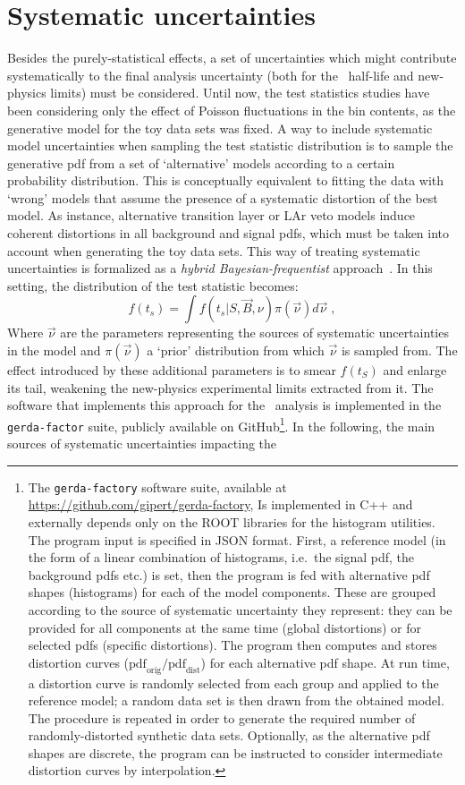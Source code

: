\section{Systematic uncertainties}%
\label{sec:2nbb-ana:systematics}

Besides the purely-statistical effects, a set of uncertainties which might contribute
systematically to the final analysis uncertainty (both for the \nnbb\ half-life and
new-physics limits) must be considered. Until now, the test statistics studies have been
considering only the effect of Poisson fluctuations in the bin contents, as the generative
model for the toy data sets was fixed. A way to include systematic model uncertainties
when sampling the test statistic distribution is to sample the generative pdf from a set
of `alternative' models according to a certain probability distribution. This is
conceptually equivalent to fitting the data with `wrong' models that assume the presence
of a systematic distortion of the best model. As instance, alternative transition layer
or LAr veto models induce coherent distortions in all background and signal pdfs, which
must be taken into account when generating the toy data sets.
\newpar
This way of treating systematic uncertainties is formalized as a \emph{hybrid
Bayesian-frequentist} approach~\cite{Zyla2020}. In this setting, the distribution
of the test statistic becomes:
\[
  f(t_s) = \int f(t_s | S, \vec{B}, \nu) \pi(\vec{\nu}) d\vec{\nu} \;,
\]
Where $\vec{\nu}$ are the parameters representing the sources of systematic uncertainties
in the model and $\pi(\vec{\nu})$ a `prior' distribution from which $\vec{\nu}$ is sampled
from. The effect introduced by these additional parameters is to smear $f(t_S)$ and
enlarge its tail, weakening the new-physics experimental limits extracted from it. The
software that implements this approach for the \nnbb\ analysis is implemented in the
\texttt{gerda-factor} suite, publicly available on GitHub\footnote{%
  The \texttt{gerda-factory} software suite, available at
  \url{https://github.com/gipert/gerda-factory}, Is implemented in C++ and externally
  depends only on the ROOT libraries for the histogram utilities. The program input is
  specified in JSON format. First, a reference model (in the form of a linear combination
  of histograms, i.e.~the signal pdf, the background pdfs etc.) is set, then the program
  is fed with alternative pdf shapes (histograms) for each of the model components. These
  are grouped according to the source of systematic uncertainty they represent: they can
  be provided for all components at the same time (global distortions) or for selected
  pdfs (specific distortions). The program then computes and stores distortion curves
  ($\text{pdf}_\text{orig}/\text{pdf}_\text{dist}$) for each alternative pdf shape. At run
  time, a distortion curve is randomly selected from each group and applied to the
  reference model; a random data set is then drawn from the obtained model. The procedure
  is repeated in order to generate the required number of randomly-distorted synthetic
  data sets. Optionally, as the alternative pdf shapes are discrete, the program can be
  instructed to consider intermediate distortion curves by interpolation.
}. In the following, the main sources of systematic uncertainties impacting the \nnbb\
